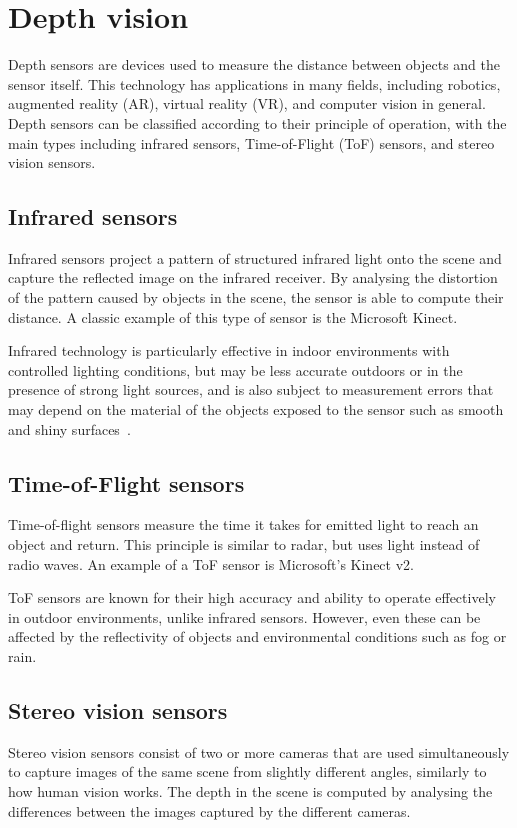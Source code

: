 \section{Depth vision}\label{sec:depth-vision}
Depth sensors are devices used to measure the distance between objects and the sensor itself.
This technology has applications in many fields, including robotics, augmented reality (AR), virtual reality (VR),
and computer vision in general.
Depth sensors can be classified according to their principle of operation,
with the main types including infrared sensors, Time-of-Flight (ToF) sensors, and stereo vision sensors.

\subsection{Infrared sensors}\label{subsec:infrared-sensors}
Infrared sensors project a pattern of structured infrared light onto
the scene and capture the reflected image on the infrared receiver.
By analysing the distortion of the pattern caused by objects in the scene,
the sensor is able to compute their distance.
A classic example of this type of sensor is the Microsoft Kinect.

Infrared technology is particularly effective in indoor environments with controlled lighting conditions,
but may be less accurate outdoors or in the presence of strong light sources,
and is also subject to measurement errors that may depend on the material of the objects exposed
to the sensor such as smooth and shiny surfaces~\cite{kinect-resolution}.

\subsection{Time-of-Flight sensors}\label{subsec:time-of-flight-sensors}
Time-of-flight sensors measure the time it takes for emitted light to reach an object and return.
This principle is similar to radar, but uses light instead of radio waves.
An example of a ToF sensor is Microsoft's Kinect v2.

ToF sensors are known for their high accuracy and ability to operate
effectively in outdoor environments, unlike infrared sensors.
However, even these can be affected by the reflectivity of objects and environmental conditions such as fog or rain.

\subsection{Stereo vision sensors}\label{subsec:stereo-vision-sensors}
Stereo vision sensors consist of two or more cameras that are used simultaneously to capture
images of the same scene from slightly different angles, similarly to how human vision works.
The depth in the scene is computed by analysing the differences between the images captured by the different cameras.

